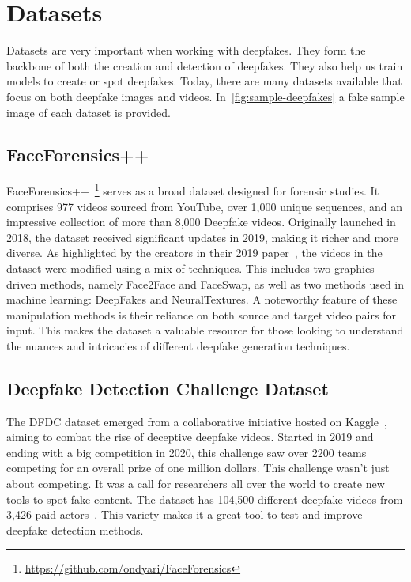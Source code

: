 \section{Datasets}
Datasets are very important when working with deepfakes. They form the backbone of both
the creation and detection of deepfakes. They also help us train models to create or spot
deepfakes. Today, there are many datasets available that focus on both deepfake images
and videos. In~\autoref{fig:sample-deepfakes} a fake sample image of each dataset is provided.

\subsection{FaceForensics++}\label{section:ff++}
FaceForensics++~\footnote{\url{https://github.com/ondyari/FaceForensics}} serves as a 
broad dataset designed for forensic studies. It
comprises 977 videos sourced from YouTube, over 1,000 unique sequences, and an
impressive collection of more than 8,000 Deepfake videos. Originally launched in
2018, the dataset received significant updates in 2019, making it richer and more
diverse. As highlighted by the creators in their 2019 paper~\cite{roessler2019faceforensicspp},
the videos in the dataset were modified using a mix of techniques. This includes two
graphics-driven methods, namely Face2Face and FaceSwap, as well as two methods used
in machine learning: DeepFakes and NeuralTextures. A noteworthy feature of these
manipulation methods is their reliance on both source and target video pairs for input.
This makes the dataset a valuable resource for those looking to understand the
nuances and intricacies of different deepfake generation techniques.

\subsection{Deepfake Detection Challenge Dataset}
The \ac{DFDC} dataset emerged from a collaborative initiative hosted on Kaggle~\cite{kaggle2020},
aiming to combat the rise of deceptive deepfake videos. Started in 2019 and ending
with a big competition in 2020, this challenge saw over 2200 teams competing for an
overall prize of one million dollars. This challenge wasn't just about competing.
It was a call for researchers all over the world to create new tools to spot fake
content. The dataset has 104,500 different deepfake videos from 3,426 paid
actors~\cite{dolhansky2020deepfake}. This variety makes it a great tool to test and improve deepfake detection
methods.

